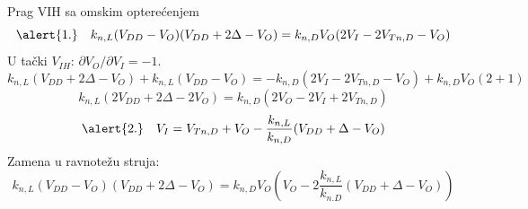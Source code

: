 \begin{frame}[label=09_1-s044]{Prag VIH sa omskim opterećenjem}\setlength{\parskip}{2pt}\setlength{\abovedisplayskip}{4pt}\setlength{\belowdisplayskip}{4pt}\setlength{\abovedisplayshortskip}{3pt}\setlength{\belowdisplayshortskip}{3pt}
\[\alert{1.}\quad k_{n,L}(V_{DD}-V_O)(V_{DD}+2\Delta-V_O)=k_{n,D}V_O(2V_I-2V_{Tn,D}-V_O)\]
U tački $V_{IH}$: $\partial V_O/\partial V_I=-1$.\[k_{n,L}(V_{DD}+2\Delta-V_O)+k_{n,L}(V_{DD}-V_O)=-k_{n,D}(2V_I-2V_{Tn,D}-V_O)+k_{n,D}V_O(2+1)\]
\[k_{n,L}(2V_{DD}+2\Delta-2V_O)=k_{n,D}(2V_O-2V_I+2V_{Tn,D})\]
\[\alert{2.}\quad V_I=V_{Tn,D}+V_O-\frac{k_{n,L}}{k_{n,D}}(V_{DD}+\Delta-V_O)\]
Zamena u ravnotežu struja:\[k_{n,L}(V_{DD}-V_O)(V_{DD}+2\Delta-V_O)=k_{n,D}V_O\left(V_O-2\frac{k_{n,L}}{k_{n.D}}(V_{DD}+\Delta-V_O)\right)\]

\end{frame}

